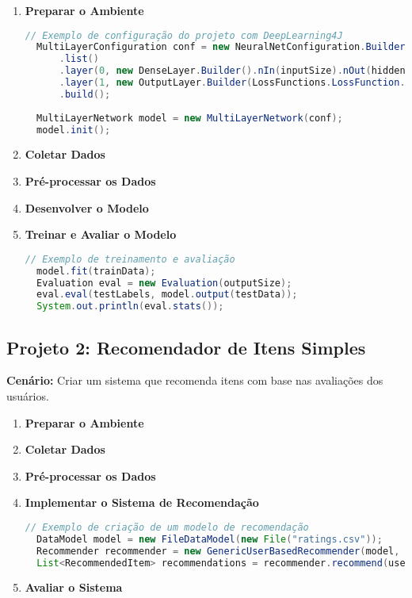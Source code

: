 \documentclass[a4paper,12pt]{book}
\begin{document}
\begin{enumerate}
  \item \textbf{Preparar o Ambiente}
  \begin{lstlisting}[language=java]
  // Exemplo de configuração do projeto com DeepLearning4J
  MultiLayerConfiguration conf = new NeuralNetConfiguration.Builder()
      .list()
      .layer(0, new DenseLayer.Builder().nIn(inputSize).nOut(hiddenUnits).activation(Activation.RELU).build())
      .layer(1, new OutputLayer.Builder(LossFunctions.LossFunction.XENT).nIn(hiddenUnits).nOut(outputSize).activation(Activation.SOFTMAX).build())
      .build();
  
  MultiLayerNetwork model = new MultiLayerNetwork(conf);
  model.init();
  \end{lstlisting}

  \item \textbf{Coletar Dados}
  \item \textbf{Pré-processar os Dados}
  \item \textbf{Desenvolver o Modelo}
  \item \textbf{Treinar e Avaliar o Modelo}
  \begin{lstlisting}[language=java]
  // Exemplo de treinamento e avaliação
  model.fit(trainData);
  Evaluation eval = new Evaluation(outputSize);
  eval.eval(testLabels, model.output(testData));
  System.out.println(eval.stats());
  \end{lstlisting}
\end{enumerate}

\subsection{Projeto 2: Recomendador de Itens Simples}
\textbf{Cenário:} Criar um sistema que recomenda itens com base nas avaliações dos usuários.

\begin{enumerate}
  \item \textbf{Preparar o Ambiente}
  \item \textbf{Coletar Dados}
  \item \textbf{Pré-processar os Dados}
  \item \textbf{Implementar o Sistema de Recomendação}
  \begin{lstlisting}[language=java]
  // Exemplo de criação de um modelo de recomendação
  DataModel model = new FileDataModel(new File("ratings.csv"));
  Recommender recommender = new GenericUserBasedRecommender(model, new PearsonCorrelationSimilarity(model), new NearestNUserNeighborhood(2, new PearsonCorrelationSimilarity(model), model));
  List<RecommendedItem> recommendations = recommender.recommend(userId, numberOfRecommendations);
  \end{lstlisting}
  \item \textbf{Avaliar o Sistema}
\end{enumerate}
\end{document}
